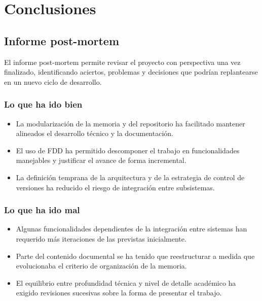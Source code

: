 \chapter{Conclusiones}

\begin{abstract}
Este capítulo recoge la valoración final del proyecto, sintetizando el aprendizaje
obtenido durante el desarrollo y señalando las líneas de mejora que quedan abiertas.
\end{abstract}

\section{Informe post-mortem}
El informe post-mortem permite revisar el proyecto con perspectiva una vez finalizado,
identificando aciertos, problemas y decisiones que podrían replantearse en un nuevo ciclo
de desarrollo.

\subsection{Lo que ha ido bien}
\begin{itemize}
    \item La modularización de la memoria y del repositorio ha facilitado mantener alineados el desarrollo técnico y la documentación.
    \item El uso de FDD ha permitido descomponer el trabajo en funcionalidades manejables y justificar el avance de forma incremental.
    \item La definición temprana de la arquitectura y de la estrategia de control de versiones ha reducido el riesgo de integración entre subsistemas.
\end{itemize}

\subsection{Lo que ha ido mal}
\begin{itemize}
    \item Algunas funcionalidades dependientes de la integración entre sistemas han requerido más iteraciones de las previstas inicialmente.
    \item Parte del contenido documental se ha tenido que reestructurar a medida que evolucionaba el criterio de organización de la memoria.
    \item El equilibrio entre profundidad técnica y nivel de detalle académico ha exigido revisiones sucesivas sobre la forma de presentar el trabajo.
\end{itemize}

